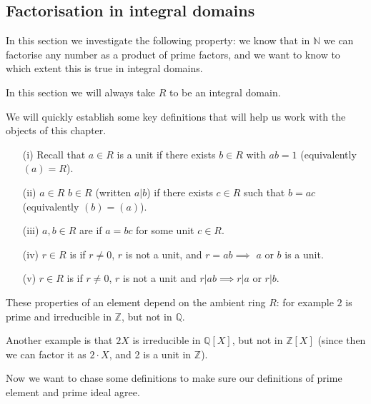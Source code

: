\documentclass[egregdoesnotlikesansseriftitles,a4paper]{scrartcl}
\begin{document}
\subsection{Factorisation in integral domains}
In this section we investigate the following property: we know that in $\mathbb{N}$ we can factorise any number as a product of prime factors, and we want to know to which extent this is true in integral domains.
\begin{remark}
       In this section we will always take $R$ to be an integral domain.
\end{remark}
\begin{definition*}
       We will quickly establish some key definitions that will help us work with the objects of this chapter.
       \begin{itemize}
             \item[(i)] Recall that $a \in R$ is a unit if there exists $b \in R$ with $ab=1$ (equivalently $(a)=R$).
             \item[(ii)] $a \in R$  $b \in R $ (written $a|b$) if there exists $c \in R $ such that $b=ac$ (equivalently $(b)=(a)$).
             \item[(iii)] $a,b \in R$ are  if $a=bc $ for some unit $c \in R$. 
             \item[(iv)] $r \in R$ is  if $r \neq 0$, $r$ is not a unit, and $r=ab \implies$ $a$ or $b$ is a unit.
             \item[(v)] $r \in R$ is  if $r \neq 0$, $r $ is not a unit and $r| ab \implies r|a $ or $r|b$.
       \end{itemize}
       \begin{remark}
              These properties of an element depend on the ambient ring $R$: for example $2$ is prime and irreducible in $\mathbb{Z}$, but not in $\mathbb{Q}$. 

              Another example is that $2X$ is irreducible in $\mathbb{Q}[X]$, but not in $\mathbb{Z}[X]$ (since then we can factor it as $2 \cdot X$, and 2 is a unit in $\mathbb{Z}$).
       \end{remark}
\end{definition*}
Now we want to chase some definitions to make sure our definitions of prime element and prime ideal agree.
\end{document}

